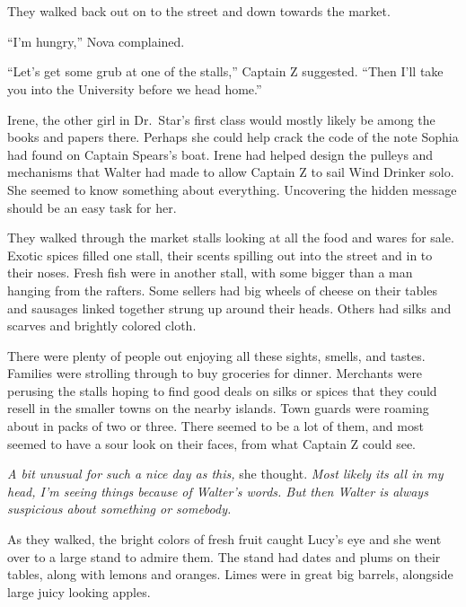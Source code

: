 \documentclass[12pt]{extbook}
\begin{document}
  \section{}\label{section-30}
  
  They walked back out on to the street and down towards the market.
  
  \enquote{I'm hungry,} Nova complained.
  
  \enquote{Let's get some grub at one of the stalls,} Captain Z suggested.
  \enquote{Then I'll take you into the University before we head home.}
  
  Irene, the other girl in Dr.~Star's first class would mostly likely be
  among the books and papers there. Perhaps she could help crack the code
  of the note Sophia had found on Captain Spears's boat. Irene had helped
  design the pulleys and mechanisms that Walter had made to allow Captain
  Z to sail Wind Drinker solo. She seemed to know something about
  everything. Uncovering the hidden message should be an easy task for
  her.
  
  They walked through the market stalls looking at all the food and wares
  for sale. Exotic spices filled one stall, their scents spilling out into
  the street and in to their noses. Fresh fish were in another stall, with
  some bigger than a man hanging from the rafters. Some sellers had big
  wheels of cheese on their tables and sausages linked together strung up
  around their heads. Others had silks and scarves and brightly colored
  cloth.
  
  There were plenty of people out enjoying all these sights, smells, and
  tastes. Families were strolling through to buy groceries for dinner.
  Merchants were perusing the stalls hoping to find good deals on silks or
  spices that they could resell in the smaller towns on the nearby
  islands. Town guards were roaming about in packs of two or three. There
  seemed to be a lot of them, and most seemed to have a sour look on their
  faces, from what Captain Z could see.
  
  \emph{A bit unusual for such a nice day as this,} she thought.
  \emph{Most likely its all in my head, I'm seeing things because of
  Walter's words. But then Walter is always suspicious about something or
  somebody.}
  
  As they walked, the bright colors of fresh fruit caught Lucy's eye and
  she went over to a large stand to admire them. The stand had dates and
  plums on their tables, along with lemons and oranges. Limes were in
  great big barrels, alongside large juicy looking apples.
  
\end{document}
